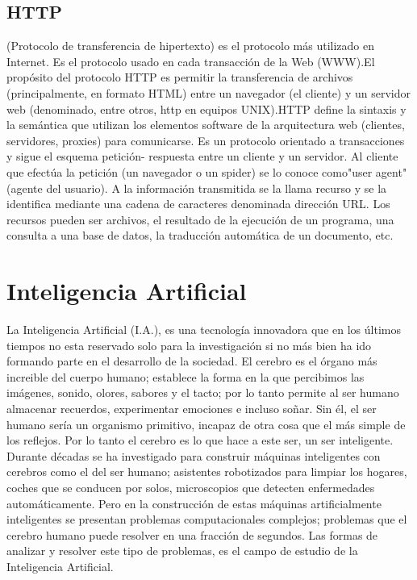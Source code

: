 \subsection{HTTP}
(Protocolo de transferencia de hipertexto) es el protocolo más utilizado en Internet. Es el protocolo usado en cada transacción de la Web (WWW).El propósito del protocolo HTTP es permitir la transferencia de archivos (principalmente, en formato HTML) entre un navegador (el cliente) y un servidor web (denominado, entre otros, http en equipos UNIX).HTTP define la sintaxis y la semántica que utilizan los elementos software de la arquitectura web (clientes, servidores, proxies) para comunicarse. Es un protocolo orientado a transacciones y sigue el esquema petición- respuesta entre un cliente y un servidor. Al cliente que efectúa la petición (un navegador o un spider) se lo conoce como"user agent" (agente del usuario). A la información transmitida se la llama recurso y se la identifica mediante una cadena de caracteres denominada dirección URL. Los recursos pueden ser archivos, el resultado de la ejecución de un programa, una consulta a una base de datos, la traducción automática de un documento, etc.

\section{Inteligencia Artificial}
La Inteligencia Artificial (I.A.), es una tecnología innovadora que en los últimos tiempos no esta reservado solo para la investigación si no más bien ha ido formando parte en el desarrollo de la sociedad. El cerebro es el órgano más increible del cuerpo humano; establece la forma en la que percibimos las imágenes, sonido, olores, sabores y el tacto; por lo tanto permite al ser humano almacenar recuerdos, experimentar emociones e incluso soñar. Sin él, el ser humano sería un organismo primitivo, incapaz de otra cosa que el más simple de los reflejos. Por lo tanto el cerebro es lo que hace a este ser, un ser inteligente.\\

Durante décadas se ha investigado para construir máquinas inteligentes con cerebros como el del ser humano; asistentes robotizados para limpiar los hogares, coches que se conducen por solos, microscopios que detecten enfermedades automáticamente. Pero en la construcción de estas máquinas artificialmente inteligentes se presentan problemas computacionales complejos; problemas que el cerebro humano puede resolver en una fracción de segundos. Las formas de analizar y resolver este tipo de problemas, es el campo de estudio de la Inteligencia Artificial.

